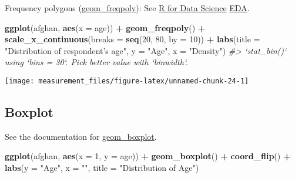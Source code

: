 \documentclass[]{book}
\newenvironment{Shaded}{\begin{snugshade}}{\end{snugshade}}
\newcommand{\CommentTok}[1]{\textcolor[rgb]{0.56,0.35,0.01}{\textit{#1}}}
\newcommand{\DataTypeTok}[1]{\textcolor[rgb]{0.13,0.29,0.53}{#1}}
\newcommand{\DecValTok}[1]{\textcolor[rgb]{0.00,0.00,0.81}{#1}}
\newcommand{\KeywordTok}[1]{\textcolor[rgb]{0.13,0.29,0.53}{\textbf{#1}}}
\newcommand{\NormalTok}[1]{#1}
\newcommand{\OperatorTok}[1]{\textcolor[rgb]{0.81,0.36,0.00}{\textbf{#1}}}
\newcommand{\StringTok}[1]{\textcolor[rgb]{0.31,0.60,0.02}{#1}}
\theoremstyle{definition}
\theoremstyle{definition}
\theoremstyle{definition}
\theoremstyle{remark}
\begin{document}
Frequency polygons
(\href{https://www.rdocumentation.org/packages/ggplot2/topics/geom_freqpoly}{geom\_freqpoly}):
See \href{http://r4ds.had.co.nz/}{R for Data Science}
\href{http://r4ds.had.co.nz/exploratory-data-analysis.html}{EDA}.

\begin{Shaded}
\begin{Highlighting}[]
\KeywordTok{ggplot}\NormalTok{(afghan, }\KeywordTok{aes}\NormalTok{(}\DataTypeTok{x =}\NormalTok{ age)) }\OperatorTok{+}
\StringTok{  }\KeywordTok{geom_freqpoly}\NormalTok{() }\OperatorTok{+}
\StringTok{  }\KeywordTok{scale_x_continuous}\NormalTok{(}\DataTypeTok{breaks =} \KeywordTok{seq}\NormalTok{(}\DecValTok{20}\NormalTok{, }\DecValTok{80}\NormalTok{, }\DataTypeTok{by =} \DecValTok{10}\NormalTok{)) }\OperatorTok{+}
\StringTok{  }\KeywordTok{labs}\NormalTok{(}\DataTypeTok{title =} \StringTok{"Distribution of respondent's age"}\NormalTok{,}
       \DataTypeTok{y =} \StringTok{"Age"}\NormalTok{, }\DataTypeTok{x =} \StringTok{"Density"}\NormalTok{)}
\CommentTok{#> `stat_bin()` using `bins = 30`. Pick better value with `binwidth`.}
\end{Highlighting}
\end{Shaded}

\begin{center}\texttt{[image: measurement\_files/figure-latex/unnamed-chunk-24-1]} \end{center}

\hypertarget{boxplot}{%
\subsection{Boxplot}\label{boxplot}}

See the documentation for
\href{https://www.rdocumentation.org/packages/ggplot2/topics/geom_boxplot}{geom\_boxplot}.

\begin{Shaded}
\begin{Highlighting}[]
\KeywordTok{ggplot}\NormalTok{(afghan, }\KeywordTok{aes}\NormalTok{(}\DataTypeTok{x =} \DecValTok{1}\NormalTok{, }\DataTypeTok{y =}\NormalTok{ age)) }\OperatorTok{+}
\StringTok{  }\KeywordTok{geom_boxplot}\NormalTok{() }\OperatorTok{+}
\StringTok{  }\KeywordTok{coord_flip}\NormalTok{() }\OperatorTok{+}
\StringTok{  }\KeywordTok{labs}\NormalTok{(}\DataTypeTok{y =} \StringTok{"Age"}\NormalTok{, }\DataTypeTok{x =} \StringTok{""}\NormalTok{, }\DataTypeTok{title =} \StringTok{"Distribution of Age"}\NormalTok{)}
\end{Highlighting}
\end{Shaded}
\end{document}
